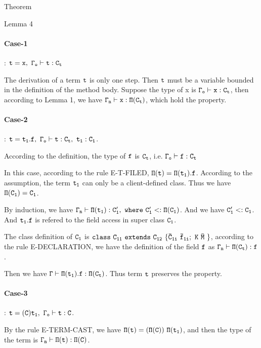 \documentclass[GBK,winfonts,a4paper,11pt]{article}
\begin{document}
\begin{section}{Theorem}
\begin{subsection}{Lemma 4}
\paragraph{Case-1}:
$\tt t=x,\ \Gamma_o\vdash t:C_t$
\par
The derivation of a term $\tt t$ is only one step. Then $\tt t$ must be a variable bounded in the definition of the method body. Suppose the type of x is $\tt\Gamma_o\vdash x:C_t$, then according to Lemma 1, we have $\tt\Gamma_n\vdash x:\Pi(C_t)$, which hold the property.


\paragraph{Case-2}:
$\tt t=t_1.f,\ \Gamma_o\vdash t:C_t,\ t_1:C_1$.
\par
According to the definition, the type of $\tt f$ is $\tt C_t$, i.e. $\tt \Gamma_o\vdash f:C_t$
\par
In this case, according to the rule E-T-FILED, $\tt \Pi(t)=\Pi(t_1).f$. 
According to the assumption, the term $\tt t_1$ can only be a client-defined class. Thus we have $\tt \Pi(C_1)=C_1$.
\par
By induction, we have $\tt \Gamma_n\vdash\Pi(t_1):C'_1,\ where\ C'_1<:\Pi(C_1)$. And we have $\tt C'_1<:C_1$. And $\tt t_1.f$ is refered to the field access in super class $\tt C_1$.
\par
The class definition of $\tt C_1$ is $\tt class\ C_{11}\ extends\ C_{12}\ \{ \bar{C}_{1i}\ \bar{f}_{1i};\ K\ \bar{M}\ \}$, according to the rule E-DECLARATION, we have the definition of the field $\tt f$ as $\tt \Gamma_n\vdash \Pi(C_t):f$. 
\par
Then we have $\tt \Gamma\vdash \Pi(t_1).f:\Pi(C_t)$. Thus term $\tt t$ preserves the property.

\paragraph{Case-3}:
$\tt t=(C) t_1,\ \Gamma_o\vdash t:C$.
\par
By the rule E-TERM-CAST, we have $\tt\Pi(t)=(\Pi(C))\ \Pi(t_1)$, and then the type of the term is $\tt\Gamma_n\vdash \Pi(t):\Pi(C)$.


\end{subsection}
\end{section}
\end{document}
